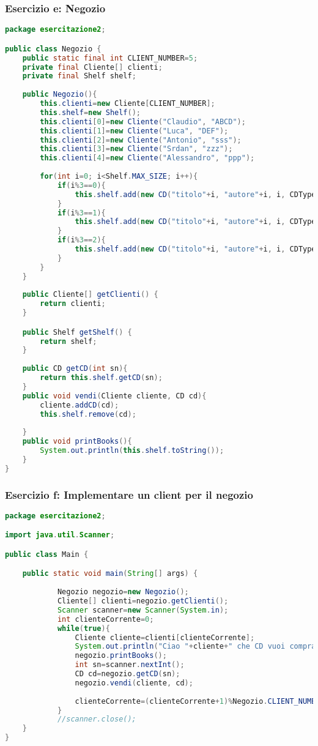 \documentclass{article}
\begin{document}
\subsubsection{Esercizio e: Negozio}
\begin{lstlisting}[language=Java,escapechar=|]
package esercitazione2;

public class Negozio {
	public static final int CLIENT_NUMBER=5;
	private final Cliente[] clienti;
	private final Shelf shelf;
	
	public Negozio(){
		this.clienti=new Cliente[CLIENT_NUMBER];
		this.shelf=new Shelf();
		this.clienti[0]=new Cliente("Claudio", "ABCD");
		this.clienti[1]=new Cliente("Luca", "DEF");
		this.clienti[2]=new Cliente("Antonio", "sss");
		this.clienti[3]=new Cliente("Srdan", "zzz");
		this.clienti[4]=new Cliente("Alessandro", "ppp");
		
		for(int i=0; i<Shelf.MAX_SIZE; i++){
			if(i%3==0){
				this.shelf.add(new CD("titolo"+i, "autore"+i, i, CDType.DANCE));
			}
			if(i%3==1){
				this.shelf.add(new CD("titolo"+i, "autore"+i, i, CDType.COUNTRY));
			}
			if(i%3==2){
				this.shelf.add(new CD("titolo"+i, "autore"+i, i, CDType.DANCE));
			}
		}
	}
	
	public Cliente[] getClienti() {
		return clienti;
	}

	public Shelf getShelf() {
		return shelf;
	}
	
	public CD getCD(int sn){
		return this.shelf.getCD(sn);
	}
	public void vendi(Cliente cliente, CD cd){
		cliente.addCD(cd);
		this.shelf.remove(cd);
		
	}
	public void printBooks(){
		System.out.println(this.shelf.toString());
	}
}

\end{lstlisting}

\subsubsection{Esercizio f: Implementare un client per il negozio}

\begin{lstlisting}[language=Java,escapechar=|]
package esercitazione2;

import java.util.Scanner;

public class Main {

	public static void main(String[] args) {
		
			Negozio negozio=new Negozio();
			Cliente[] clienti=negozio.getClienti();
			Scanner scanner=new Scanner(System.in);
			int clienteCorrente=0;
			while(true){
				Cliente cliente=clienti[clienteCorrente];
				System.out.println("Ciao "+cliente+" che CD vuoi comprare?");
				negozio.printBooks();
				int sn=scanner.nextInt();
				CD cd=negozio.getCD(sn);
				negozio.vendi(cliente, cd);
				
				clienteCorrente=(clienteCorrente+1)%Negozio.CLIENT_NUMBER;
			}
			//scanner.close();
	}
}
\end{lstlisting}
\end{document}
